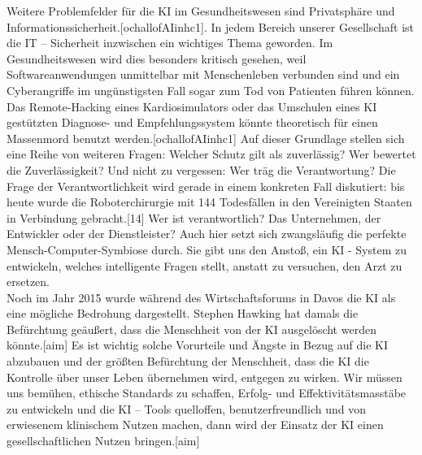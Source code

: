 Weitere Problemfelder für die KI im Gesundheitswesen sind Privatsphäre und Informationssicherheit.[ochallofAIinhc1]. In jedem Bereich unserer Gesellschaft ist die IT – Sicherheit inzwischen ein wichtiges Thema geworden. Im Gesundheitswesen wird dies besonders kritisch gesehen, weil Softwareanwendungen unmittelbar mit Menschenleben verbunden sind und ein Cyberangriffe im ungünstigsten Fall sogar zum Tod von Patienten führen können. Das Remote-Hacking eines Kardiosimulators oder das Umschulen eines KI gestützten Diagnose- und Empfehlungssystem könnte theoretisch für einen Massenmord benutzt werden.[ochallofAIinhc1] 
Auf dieser Grundlage stellen sich eine Reihe von weiteren Fragen: Welcher Schutz gilt als zuverlässig? Wer bewertet die Zuverlässigkeit? Und nicht zu vergessen: Wer träg die Verantwortung? 
Die Frage der Verantwortlichkeit wird gerade in einem konkreten Fall diskutiert: bis heute wurde die Roboterchirurgie mit 144 Todesfällen in den Vereinigten Staaten in Verbindung gebracht.[14] Wer ist verantwortlich? Das Unternehmen, der Entwickler oder der Dienstleister? Auch hier setzt sich zwangsläufig die perfekte Mensch-Computer-Symbiose durch. Sie gibt uns den Anstoß, ein KI - System zu entwickeln, welches intelligente Fragen stellt, anstatt zu versuchen, den Arzt zu ersetzen.\\

Noch im Jahr 2015 wurde während des Wirtschaftsforums in Davos die KI als eine mögliche Bedrohung dargestellt. Stephen Hawking hat damals die Befürchtung geäußert, dass die Menschheit von der KI ausgelöscht werden könnte.[aim] Es ist wichtig solche Vorurteile und Ängste in Bezug auf die KI abzubauen und der größten Befürchtung der Menschheit, dass die KI die Kontrolle über unser Leben übernehmen wird, entgegen zu wirken. Wir müssen uns bemühen, ethische Standards zu schaffen, Erfolg- und Effektivitätsmasstäbe zu entwickeln und die KI – Tools quelloffen, benutzerfreundlich und von erwiesenem klinischem Nutzen machen, dann wird der Einsatz der KI einen gesellschaftlichen Nutzen bringen.[aim] 
